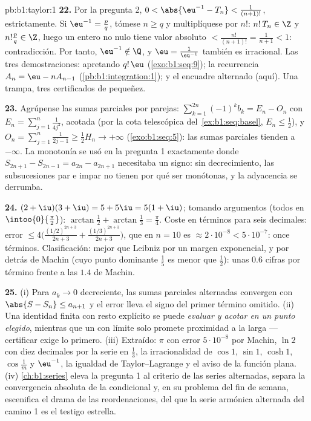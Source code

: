 \begin{solution}{pb:b1:taylor:1}
\textbf{22.} Por la pregunta 2,
$0 < \abs{\eu^{-1} - T_n} < \frac{1}{(n+1)!}$, estrictamente. Si
$\eu^{-1} = \frac pq$, tómese $n \geq q$ y multiplíquese por $n!$:
$n!\,T_n \in \Z$ y $n!\frac pq \in \Z$, luego un entero no nulo
tiene valor absoluto $< \frac{n!}{(n+1)!} = \frac{1}{n+1} < 1$:
contradicción. Por tanto, $\eu^{-1} \notin \Q$, y
$\eu = \frac{1}{\eu^{-1}}$ también es irracional. Las tres
demostraciones:  apretando $q!\,\eu$
(\cref{exo:b1:seq:9}); la recurrencia 
$A_n = \eu - nA_{n-1}$ (\cref{pb:b1:integration:1}); y el encuadre
alternado (aquí). Una trampa, tres certificados de pequeñez.

\textbf{23.} Agrúpense las sumas parciales por parejas:
$\sum_{k=1}^{2n} (-1)^k b_k = E_n - O_n$ con
$E_n = \sum_{j=1}^{n} \frac{1}{4j^2}$, acotada (por la cota
telescópica del~\cref{ex:b1:seq:basel}, $E_n \leq \frac12$), y
$O_n = \sum_{j=1}^{n}\frac{1}{2j-1} \geq \frac12 H_n \to +\infty$
(\cref{exo:b1:seq:5}): las sumas parciales tienden a $-\infty$. La
monotonía se usó en la pregunta 1 exactamente donde
$S_{2n+1} - S_{2n-1} = a_{2n} - a_{2n+1}$ necesitaba un signo: sin
decrecimiento, las subsucesiones par e impar no tienen por qué ser
monótonas, y la adyacencia se derrumba.

\textbf{24.} $(2+\iu)(3+\iu) = 5 + 5\iu = 5(1+\iu)$; tomando
argumentos (todos en $\intoo{0}{\frac\pi2}$):
$\arctan\frac12 + \arctan\frac13 = \frac\pi4$. Coste en términos
para seis decimales: error
$\leq 4\bigl(\frac{(1/2)^{2n+3}}{2n+3} +
\frac{(1/3)^{2n+3}}{2n+3}\bigr)$, que en $n = 10$ es
$\approx 2\cdot10^{-8} < 5\cdot10^{-7}$: once términos.
Clasificación: mejor que Leibniz por un margen exponencial, y por
detrás de Machin (cuyo punto dominante $\frac15$ es menor que
$\frac12$): unas $0.6$ cifras por término frente a las $1.4$ de
Machin.

\textbf{25.} (i) Para $a_k \to 0$ decreciente, las sumas
parciales alternadas convergen con $\abs{S - S_n} \leq a_{n+1}$ y el
error lleva el signo del primer término omitido. (ii) Una identidad
finita con resto explícito se puede \emph{evaluar y acotar en un
punto elegido}, mientras que un  con límite solo promete
proximidad a la larga --- certificar exige lo primero.
(iii) Extraído: $\pi$ con error $5\cdot10^{-8}$ por Machin, $\ln 2$
con diez decimales por la serie en $\frac13$, la irracionalidad de
$\cos 1$, $\sin 1$, $\cosh 1$, $\cos\frac1m$ y $\eu^{-1}$, la
igualdad de Taylor--Lagrange y el aviso de la función plana.
(iv) \cref{ch:b1:series} eleva la pregunta 1 al criterio de las
series alternadas, separa la convergencia absoluta de la condicional
y, en su problema del fin de semana, escenifica el drama de las
reordenaciones, del que la serie armónica alternada del camino 1 es
el testigo estrella.
\end{solution}
